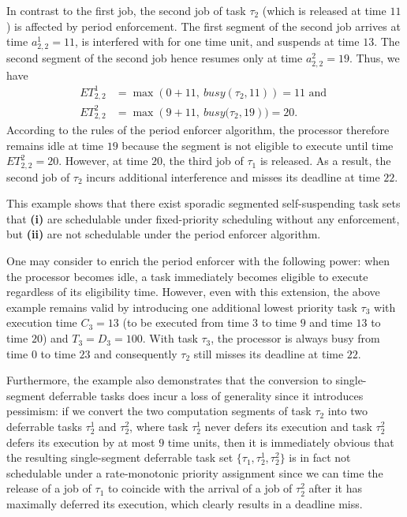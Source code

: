 In contrast to the first job, the second job of task $\tau_2$ (which is released at time $11$) is affected by period enforcement. The first segment of the second job arrives at time $a^1_{2,2} = 11$, is interfered with for one time unit, and suspends at time $13$. The  second segment of the second job hence resumes only at time $a^2_{2,2} = 19$. Thus, we have
\begin{align*}
	ET_{2,2}^1 & = \max\left(0 + 11,\ \mathit{busy}(\tau_2, 11)\right) = 11  \text{ and }
\\
	ET_{2,2}^2 & = \max\left(9 + 11,\ \mathit{busy}(\tau_2, 19\right) ) = 20.
\end{align*}
According to the rules of the period enforcer algorithm, the processor therefore remains idle at time $19$ because the segment is not eligible to execute until time $ET_{2,2}^2 = 20$. However, at time $20$, the third job of $\tau_1$ is released. As a result, the second job of $\tau_2$ incurs additional interference and misses its deadline at time $22$.




This example shows that there exist sporadic segmented self-suspending task sets that   \textbf{(i)} are schedulable under fixed-priority scheduling without any enforcement, but \textbf{(ii)} are not schedulable under the period enforcer algorithm.


One may consider to enrich the period enforcer with the following power: when the processor becomes idle, a task immediately becomes eligible to execute regardless of its eligibility time. However, even with this extension, the above example remains valid by introducing one additional lowest priority task $\tau_3$ with execution time $C_3=13$ (to be executed from time $3$ to time $9$ and time $13$ to time $20$) and $T_3=D_3=100$. With task $\tau_3$, the processor is always busy from time $0$ to time $23$ and consequently $\tau_2$ still misses its deadline at time $22$.


Furthermore, the example also demonstrates that the conversion to single-segment deferrable tasks does incur a loss of generality since it introduces pessimism: if we convert the two computation segments of task $\tau_2$ into two deferrable tasks $\tau_2^1$ and $\tau_2^2$, where  task $\tau_2^1$ never defers its execution and task $\tau_2^2$ defers its execution by at most \emph{$9$} time units,  then it is immediately obvious that the resulting single-segment deferrable task set $\{\tau_1, \tau_2^1, \tau_2^2\}$ is in fact not schedulable under a rate-monotonic priority assignment since we can time the release of a job of $\tau_1$ to coincide with the arrival of a job of $\tau_2^2$ after it has maximally deferred its execution, which clearly results in a deadline miss.



